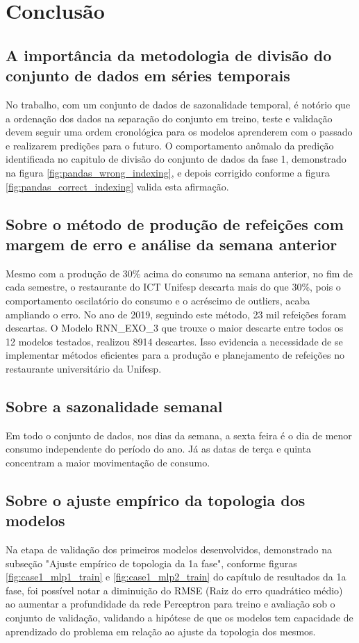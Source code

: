\chapter{Conclusão} \label{cap:conclusoes}

    \section{A importância da metodologia de divisão do conjunto de dados em séries temporais}
       No trabalho, com um conjunto de dados de sazonalidade temporal, é notório que a ordenação dos dados na separação do conjunto em treino, teste e validação devem seguir uma ordem cronológica para os modelos aprenderem com o passado e realizarem predições para o futuro. 
        O comportamento anômalo da predição identificada no capitulo de divisão do conjunto de dados da fase 1, demonstrado na figura \ref{fig:pandas_wrong_indexing}, e depois corrigido conforme a figura \ref{fig:pandas_correct_indexing} valida esta afirmação.

    \section{Sobre o método de produção de refeições com margem de erro e análise da semana anterior}
        Mesmo com a produção de 30\% acima do consumo na semana anterior, no fim de cada semestre, o restaurante do ICT Unifesp descarta mais do que 30\%, pois o comportamento oscilatório do consumo e o acréscimo de outliers, acaba ampliando o erro. No ano de 2019, seguindo este método, 23 mil refeições foram descartas.
        O Modelo RNN\_EXO\_3 que trouxe o maior descarte entre todos os 12 modelos testados, realizou 8914 descartes.
        Isso evidencia a necessidade de se implementar métodos eficientes para a produção e planejamento de refeições no restaurante universitário da Unifesp.
    
    \section{Sobre a sazonalidade semanal}
        Em todo o conjunto de dados, nos dias da semana, a sexta feira é o dia de menor consumo independente do período do ano. Já as datas de terça e quinta concentram a maior movimentação de consumo.
    
    \section{Sobre o ajuste empírico da topologia dos modelos}
        Na etapa de validação dos primeiros modelos desenvolvidos, demonstrado na subseção "Ajuste empírico de topologia da 1a fase", conforme figuras \ref{fig:case1_mlp1_train} e \ref{fig:case1_mlp2_train} do capítulo de resultados da 1a fase, foi possível notar a diminuição do RMSE (Raiz do erro quadrático médio) ao aumentar a profundidade da rede Perceptron para treino e avaliação sob o conjunto de validação, validando a hipótese de que os modelos tem capacidade de aprendizado do problema em relação ao ajuste da topologia dos mesmos.

